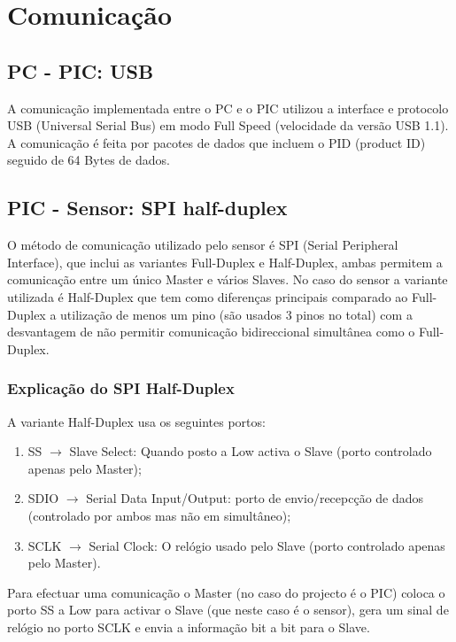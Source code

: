 \documentclass[a4paper]{article}
\begin{document}


\tableofcontents
\pagebreak

\section{Comunicação}
\label{sec:comunicacao}

\subsection{PC - PIC: USB}
A comunicação implementada entre o PC e o PIC utilizou a interface e protocolo USB (Universal Serial Bus) em modo Full Speed (velocidade da versão USB 1.1).
A comunicação é feita por pacotes de dados que incluem o PID (product ID) seguido de 64 Bytes de dados.   

\subsection{PIC - Sensor: SPI half-duplex}
O método de comunicação utilizado pelo sensor é SPI (Serial Peripheral Interface), que inclui as variantes Full-Duplex e Half-Duplex, ambas permitem a comunicação entre um único Master e vários Slaves.
No caso do sensor a variante utilizada é Half-Duplex que tem como diferenças principais comparado ao Full-Duplex a utilização de menos um pino (são usados 3 pinos no total) com a desvantagem de não permitir comunicação bidireccional simultânea como o Full-Duplex.

\subsubsection{Explicação do SPI Half-Duplex}  
A variante Half-Duplex usa os seguintes portos:
\begin{enumerate}
	\item SS $\rightarrow$ Slave Select: Quando posto a Low activa o Slave (porto controlado apenas pelo Master);
	\item SDIO $\rightarrow$ Serial Data Input/Output: porto de envio/recepcção de dados (controlado por ambos mas não em simultâneo);
	\item SCLK $\rightarrow$ Serial Clock: O relógio usado pelo Slave (porto controlado apenas pelo Master).
\end{enumerate}

Para efectuar uma comunicação o Master (no caso do projecto é o PIC) coloca o porto SS a Low para activar o Slave (que neste caso é o sensor), gera um sinal de relógio no porto SCLK e envia a informação bit a bit para o Slave.
\end{document}
